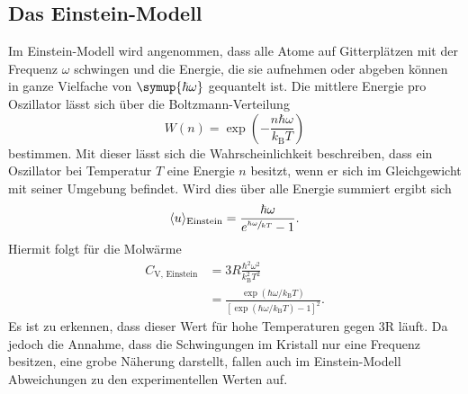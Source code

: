 \subsection{Das Einstein-Modell}
Im Einstein-Modell wird angenommen, dass alle Atome auf Gitterplätzen mit der Frequenz $\omega$ schwingen und die Energie, die sie aufnehmen oder abgeben können in ganze Vielfache
von $\symup{\hbar\omega}$ gequantelt ist. Die mittlere Energie pro Oszillator lässt sich über die Boltzmann-Verteilung
\begin{equation}
   W(n) = \exp\left( -\frac{n\hbar\omega}{k_\text{B}T} \right)
\end{equation}
bestimmen. Mit dieser lässt sich die Wahrscheinlichkeit beschreiben, dass ein Oszillator bei Temperatur $T$ eine Energie $n$ besitzt, wenn er sich im Gleichgewicht mit seiner Umgebung befindet.
Wird dies über alle Energie summiert ergibt sich
\begin{equation}
  \langle u\rangle_\text{Einstein}=\frac{\hbar\omega}{e^{\sfrac{\hbar\omega}{kT}}-1}.
\end{equation}
Hiermit folgt für die Molwärme
\begin{align}
  C_\text{V, Einstein} &= 3R\frac{\hbar^2\omega^2}{k_\text{B}^2T^2}\\
   &= \frac{\exp(\hbar\omega/k_\text{B}T)}{[\exp(\hbar\omega/k_\text{B}T)-1]^2}.
\end{align}
Es ist zu erkennen, dass dieser Wert für hohe Temperaturen gegen 3R läuft. Da jedoch die Annahme, dass die Schwingungen im Kristall nur eine Frequenz besitzen, eine grobe
Näherung darstellt, fallen auch im Einstein-Modell Abweichungen zu den experimentellen Werten auf.
